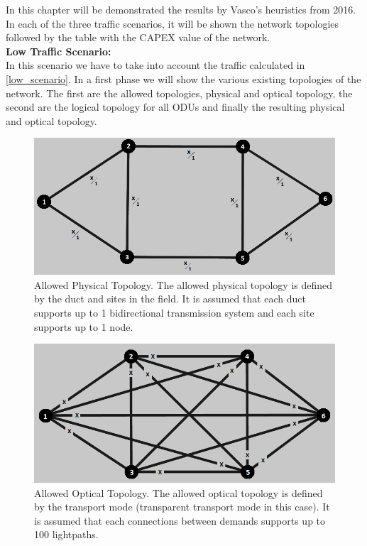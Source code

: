 In this chapter will be demonstrated the results by Vasco's heuristics from 2016. In each of the three traffic scenarios, it will be shown the network topologies followed by the table with the CAPEX value of the network.\\

\textbf{Low Traffic Scenario:}\\

In this scenario we have to take into account the traffic calculated in \ref{low_scenario}. In a first phase we will show the various existing topologies of the network. The first are the allowed topologies, physical and optical topology, the second are the logical topology for all ODUs and finally the resulting physical and optical topology.\\

\begin{figure}[H]
\centering
\includegraphics[width=13cm]{sdf/heuristic/transparent_protection/low/allowed_physical_low}
\caption{Allowed Physical Topology. The allowed physical topology is defined by the duct and sites in the field. It is assumed that each duct supports up to 1 bidirectional transmission system and each site supports up to 1 node.}
\label{allowed_physical_protection_ref_low_heuristic_transparent}
\end{figure}

\begin{figure}[H]
\centering
\includegraphics[width=13cm]{sdf/heuristic/transparent_protection/low/allowed_optical_low}
\caption{Allowed Optical Topology. The allowed optical topology is defined by the transport mode (transparent transport mode in this case). It is assumed that each connections between demands supports up to 100 lightpaths.}
\label{allowed_optical_protection_ref_low_heuristic_transparent}
\end{figure}

